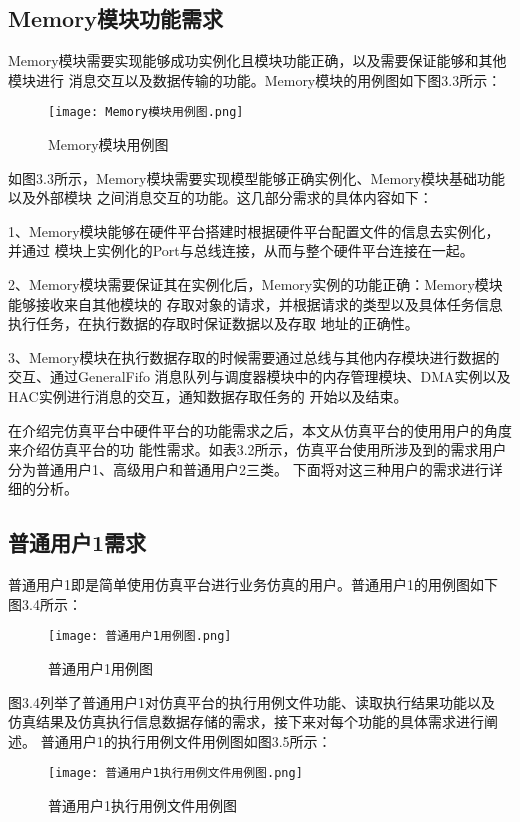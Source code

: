 \subsection{Memory模块功能需求}
Memory模块需要实现能够成功实例化且模块功能正确，以及需要保证能够和其他模块进行
消息交互以及数据传输的功能。Memory模块的用例图如下图3.3所示：

\begin{figure}[h]
    \centering
    \texttt{[image: Memory模块用例图.png]}
    \caption{Memory模块用例图}
    \label{fig:badge}
\end{figure}

如图3.3所示，Memory模块需要实现模型能够正确实例化、Memory模块基础功能以及外部模块
之间消息交互的功能。这几部分需求的具体内容如下：

1、Memory模块能够在硬件平台搭建时根据硬件平台配置文件的信息去实例化，并通过
模块上实例化的Port与总线连接，从而与整个硬件平台连接在一起。

2、Memory模块需要保证其在实例化后，Memory实例的功能正确：Memory模块能够接收来自其他模块的
存取对象的请求，并根据请求的类型以及具体任务信息执行任务，在执行数据的存取时保证数据以及存取
地址的正确性。

3、Memory模块在执行数据存取的时候需要通过总线与其他内存模块进行数据的交互、通过GeneralFifo
消息队列与调度器模块中的内存管理模块、DMA实例以及HAC实例进行消息的交互，通知数据存取任务的
开始以及结束。

在介绍完仿真平台中硬件平台的功能需求之后，本文从仿真平台的使用用户的角度来介绍仿真平台的功
能性需求。如表3.2所示，仿真平台使用所涉及到的需求用户分为普通用户1、高级用户和普通用户2三类。
下面将对这三种用户的需求进行详细的分析。

\subsection{普通用户1需求}
普通用户1即是简单使用仿真平台进行业务仿真的用户。普通用户1的用例图如下
图3.4所示：

\begin{figure}[h]
    \centering
    \texttt{[image: 普通用户1用例图.png]}
    \caption{普通用户1用例图}
    \label{fig:badge}
\end{figure}

图3.4列举了普通用户1对仿真平台的执行用例文件功能、读取执行结果功能以及
仿真结果及仿真执行信息数据存储的需求，接下来对每个功能的具体需求进行阐述。
普通用户1的执行用例文件用例图如图3.5所示：

\begin{figure}[h]
    \centering
    \texttt{[image: 普通用户1执行用例文件用例图.png]}
    \caption{普通用户1执行用例文件用例图}
    \label{fig:badge}
\end{figure}

